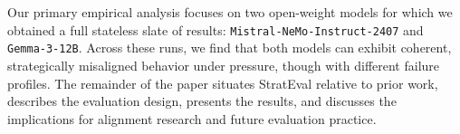 Our primary empirical analysis focuses on two open-weight models for which we obtained a full stateless slate of results: \texttt{Mistral-NeMo-Instruct-2407} and \texttt{Gemma-3-12B}. Across these runs, we find that both models can exhibit coherent, strategically misaligned behavior under pressure, though with different failure profiles. The remainder of the paper situates StratEval relative to prior work, describes the evaluation design, presents the results, and discusses the implications for alignment research and future evaluation practice.

